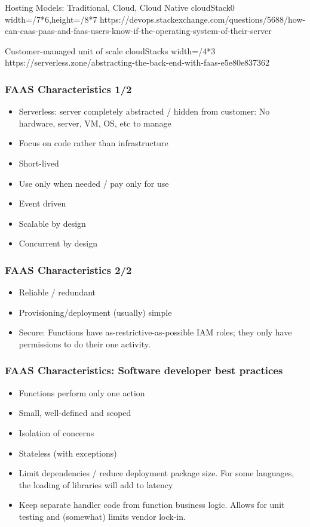 \documentclass[11pt,aspectratio=169]{beamer}
\begin{document}
\nrcanGraphicFrame
  {Hosting Models: Traditional, Cloud, Cloud Native}
  {cloudStack0}
  {width=\paperwidth/7*6,height=\paperheight/8*7}
  {https://devops.stackexchange.com/questions/5688/how-can-caas-paas-and-faas-users-know-if-the-operating-system-of-their-server}

\nrcanGraphicFrame
  {Customer-managed unit of scale}
  {cloudStacks}
  {width=\paperwidth/4*3}
  {https://serverless.zone/abstracting-the-back-end-with-faas-e5e80e837362}

\begin{nrcanFrame}
  \frametitle{FAAS Characteristics 1/2}
  \begin{itemize}
  \item Serverless: server completely abstracted / hidden from
    customer: No hardware, server, VM, OS, etc to manage
  \item Focus on code rather than infrastructure
  \item Short-lived
  \item Use only when needed / pay only for use
  \item Event driven
  \item Scalable by design
  \item Concurrent by design
  \end{itemize}
\end{nrcanFrame}


\begin{nrcanFrame}
  \frametitle{FAAS Characteristics 2/2}
  \begin{itemize}
  \item Reliable / redundant 
  \item Provisioning/deployment (usually) simple
  \item \alert{Secure}: Functions have as-restrictive-as-possible IAM roles;
    they only have permissions to do their one activity.
  \end{itemize}
\end{nrcanFrame}



\begin{nrcanFrame}
  \frametitle{FAAS Characteristics: Software developer best practices}
    \begin{itemize}
  \item Functions perform only one action
  \item Small, well-defined and scoped
  \item Isolation of concerns
  \item Stateless (with exceptions)
  \item Limit dependencies / reduce deployment package size. For some languages, the loading of
    libraries will add to latency
  \item Keep separate handler code from function business
    logic.
    Allows for unit testing and (somewhat) limits vendor lock-in.
    \end{itemize}
\end{nrcanFrame}
\end{document}
